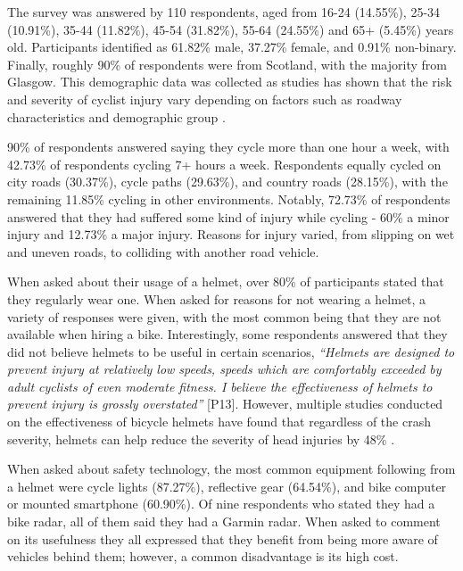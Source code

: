\documentclass{interim}
\begin{document}
The survey was answered by 110 respondents, aged from 16-24 (14.55\%), 25-34 (10.91\%), 35-44 (11.82\%), 45-54 (31.82\%), 55-64 (24.55\%) and 65+ (5.45\%) years old. Participants identified as 61.82\% male, 37.27\% female, and 0.91\% non-binary. Finally, roughly 90\% of respondents were from Scotland, with the majority from Glasgow. This demographic data was collected as studies has shown that the risk and severity of cyclist injury vary depending on factors such as roadway characteristics and demographic group \cite{BEHNOOD201735}.

90\% of respondents answered saying they cycle more than one hour a week, with 42.73\% of respondents cycling 7+ hours a week. Respondents equally cycled on city roads (30.37\%), cycle paths (29.63\%), and country roads (28.15\%), with the remaining 11.85\% cycling in other environments. Notably, 72.73\% of respondents answered that they had suffered some kind of injury while cycling - 60\% a minor injury and 12.73\% a major injury. Reasons for injury varied, from slipping on wet and uneven roads, to colliding with another road vehicle.

When asked about their usage of a helmet, over 80\% of participants stated that they regularly wear one. When asked for reasons for not wearing a helmet, a variety of responses were given, with the most common being that they are not available when hiring a bike. Interestingly, some respondents answered that they did not believe helmets to be useful in certain scenarios, \textit{“Helmets are designed to prevent injury at relatively low speeds, speeds which are comfortably exceeded by adult cyclists of even moderate fitness. I believe the effectiveness of helmets to prevent injury is grossly overstated”} [P13]. However, multiple studies conducted on the effectiveness of bicycle helmets \cite{10.1093/ije/dyw153, HOYE201885, HOYE2018239, buth2023effectiveness} have found that regardless of the crash severity, helmets can help reduce the severity of head injuries by 48\% \cite{HOYE201885}.

When asked about safety technology, the most common equipment following from a helmet were cycle lights (87.27\%), reflective gear (64.54\%), and bike computer or mounted smartphone (60.90\%). Of nine respondents who stated they had a bike radar, all of them said they had a Garmin radar. When asked to comment on its usefulness they all expressed that they benefit from being more aware of vehicles behind them; however, a common disadvantage is its high cost.
\end{document}
